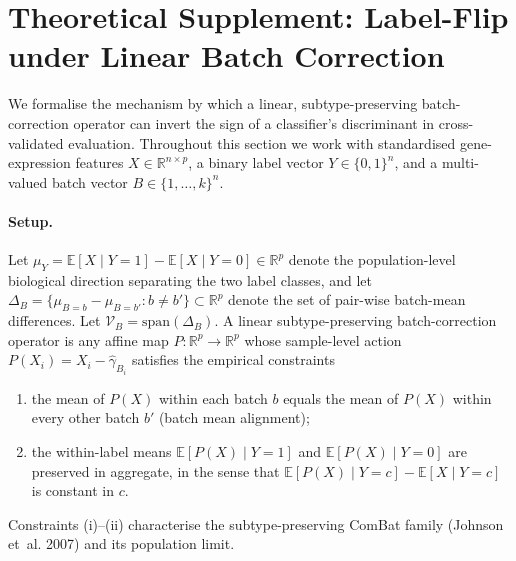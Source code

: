 
\section{Theoretical Supplement: Label-Flip under Linear Batch Correction}
\label{sec:dial-theory}

We formalise the mechanism by which a linear, subtype-preserving
batch-correction operator can invert the sign of a classifier's discriminant
in cross-validated evaluation. Throughout this section we work with
standardised gene-expression features $X \in \mathbb{R}^{n \times p}$, a
binary label vector $Y \in \{0,1\}^{n}$, and a multi-valued batch vector
$B \in \{1,\dots,k\}^{n}$.

\paragraph{Setup.} Let $\mu_Y = \mathbb{E}[X \mid Y=1] - \mathbb{E}[X \mid Y=0]
\in \mathbb{R}^{p}$ denote the population-level biological direction
separating the two label classes, and let $\Delta_B = \{\mu_{B=b} -
\mu_{B=b'} : b \ne b'\} \subset \mathbb{R}^{p}$ denote the set of
pair-wise batch-mean differences. Let
$\mathcal{V}_B = \mathrm{span}(\Delta_B)$. A linear subtype-preserving
batch-correction operator is any affine map
$P : \mathbb{R}^{p} \to \mathbb{R}^{p}$ whose sample-level action
$P(X_i) = X_i - \hat\gamma_{B_i}$ satisfies the empirical constraints
\begin{enumerate}
  \item[(i)] the mean of $P(X)$ within each batch $b$ equals the mean of
   $P(X)$ within every other batch $b'$ (batch mean alignment);
  \item[(ii)] the within-label means $\mathbb{E}[P(X) \mid Y=1]$ and
   $\mathbb{E}[P(X) \mid Y=0]$ are preserved in aggregate, in the sense
   that $\mathbb{E}[P(X) \mid Y=c] - \mathbb{E}[X \mid Y=c]$ is constant in
   $c$.
\end{enumerate}
Constraints (i)--(ii) characterise the subtype-preserving ComBat family
(Johnson et~al. 2007) and its population limit.

